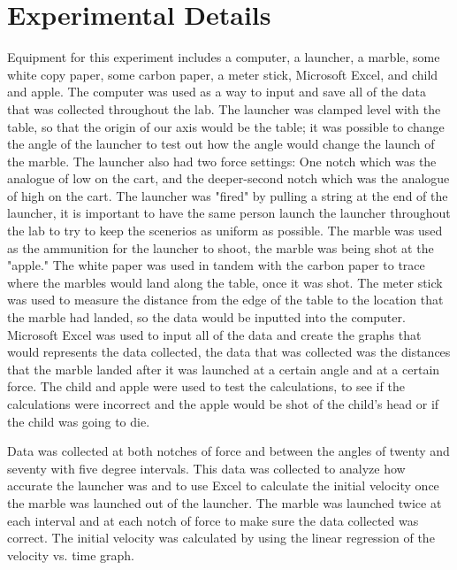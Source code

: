 \documentclass[aps,letterpaper,11pt]{revtex4}
\begin{document}
\section{Experimental Details}

Equipment for this experiment includes a computer, a launcher, a marble, some white copy paper, some carbon paper, a meter stick, Microsoft Excel, and child and apple. The computer was used as a way to input and save all of the data that was collected throughout the lab. The launcher was clamped level with the table, so that the origin of our axis would be the table; it was possible to change the angle of the launcher to test out how the angle would change the launch of the marble. The launcher also had two force settings: One notch which was the analogue of low on the cart, and the deeper-second notch which was the analogue of high on the cart. The launcher was "fired" by pulling a string at the end of the launcher, it is important to have the same person launch the launcher throughout the lab to try to keep the scenerios as uniform as possible. The marble was used as the ammunition for the launcher to shoot, the marble was being shot at the "apple." The white paper was used in tandem with the carbon paper to trace where the marbles would land along the table, once it was shot. The meter stick was used to measure the distance from the edge of the table to the location that the marble had landed, so the data would be inputted into the computer. Microsoft Excel was used to input all of the data and create the graphs that would represents the data collected, the data that was collected was the distances that the marble landed after it was launched at a certain angle and at a certain force. The child and apple were used to test the calculations, to see if the calculations were incorrect and the apple would be shot of the child's head or if the child was going to die. 

Data was collected at both notches of force and between the angles of twenty and seventy with five degree intervals. This data was collected to analyze how accurate the launcher was and to use Excel to calculate the initial velocity once the marble was launched out of the launcher. The marble was launched twice at each interval and at each notch of force to make sure the data collected was correct. The initial velocity was calculated by using the linear regression of the velocity vs. time graph.  

\vspace{-10mm}
\end{document}
